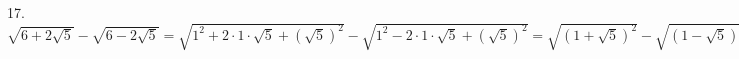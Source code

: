 17. $\sqrt{6+2\sqrt{5}}-\sqrt{6-2\sqrt{5}}=\sqrt{1^2+2\cdot1\cdot\sqrt{5}+(\sqrt{5})^2}-\sqrt{1^2-2\cdot1\cdot\sqrt{5}+(\sqrt{5})^2}=\sqrt{(1+\sqrt{5})^2}-
\sqrt{(1-\sqrt{5})^2}=|1+\sqrt{5}|-|1-\sqrt{5}|=1+\sqrt{5}-\sqrt{5}+1=2.$\\
